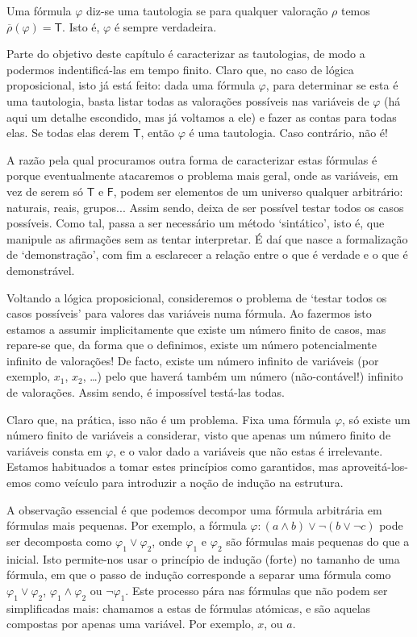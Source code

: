 \documentclass{report}
\theoremstyle{definition}
\theoremstyle{remark}
\newcommand{\lt}{\mathsf{T}}
\newcommand{\lf}{\mathsf{F}}
\begin{document}
	Uma fórmula $\varphi$ diz-se uma tautologia se para qualquer valoração $\rho$ temos $\overline\rho(\varphi) = \lt$. Isto é, $\varphi$ é sempre verdadeira.
	
	Parte do objetivo deste capítulo é caracterizar as tautologias, de modo a podermos indentificá-las em tempo finito. Claro que, no caso de lógica proposicional, isto já está feito: dada uma fórmula $\varphi$, para determinar se esta é uma tautologia, basta listar todas as valorações possíveis nas variáveis de $\varphi$ (há aqui um detalhe escondido, mas já voltamos a ele) e fazer as contas para todas elas. Se todas elas derem $\lt$, então $\varphi$ é uma tautologia. Caso contrário, não é!
	
	A razão pela qual procuramos outra forma de caracterizar estas fórmulas é porque eventualmente atacaremos o problema mais geral, onde as variáveis, em vez de serem só $\lt$ e $\lf$, podem ser elementos de um universo qualquer arbitrário: naturais, reais, grupos... Assim sendo, deixa de ser possível testar todos os casos possíveis. Como tal, passa a ser necessário um método `sintático', isto é, que manipule as afirmações sem as tentar interpretar. É daí que nasce a formalização de `demonstração', com fim a esclarecer a relação entre o que é verdade e o que é demonstrável.
	
	Voltando a lógica proposicional, consideremos o problema de `testar todos os casos possíveis' para valores das variáveis numa fórmula. Ao fazermos isto estamos a assumir implicitamente que existe um número finito de casos, mas repare-se que, da forma que o definimos, existe um número potencialmente infinito de valorações! De facto, existe um número infinito de variáveis (por exemplo, $x_1$, $x_2$, \dots) pelo que haverá também um número (não-contável!) infinito de valorações. Assim sendo, é impossível testá-las todas.
	
	Claro que, na prática, isso não é um problema. Fixa uma fórmula $\varphi$, só existe um número finito de variáveis a considerar, visto que apenas um número finito de variáveis consta em $\varphi$, e o valor dado a variáveis que não estas é irrelevante. Estamos habituados a tomar estes princípios como garantidos, mas aproveitá-los-emos como veículo para introduzir a noção de indução na estrutura.
	
	A observação essencial é que podemos decompor uma fórmula arbitrária em fórmulas mais pequenas. Por exemplo, a fórmula $\varphi : (a \land b) \lor \neg (b \lor \neg c)$ pode ser decomposta como $\varphi_1 \lor \varphi_2$, onde $\varphi_1$ e $\varphi_2$ são fórmulas mais pequenas do que a inicial. Isto permite-nos usar o princípio de indução (forte) no tamanho de uma fórmula, em que o passo de indução corresponde a separar uma fórmula como $\varphi_1 \lor \varphi_2$, $\varphi_1 \land \varphi_2$ ou $\neg \varphi_1$. Este processo pára nas fórmulas que não podem ser simplificadas mais: chamamos a estas de fórmulas atómicas, e são aquelas compostas por apenas uma variável. Por exemplo, $x$, ou $a$.
	
\end{document}
